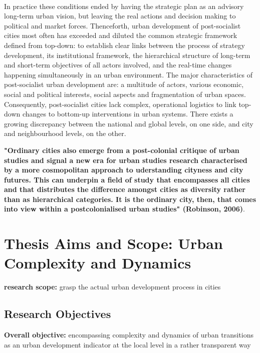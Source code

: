 \documentclass[11pt]{report}
\begin{document}
\\
In practice these conditions ended by having the strategic plan as an advisory long-term urban vision, but leaving the real actions and decision making to political and market forces. Thenceforth, urban development of post-socialist cities most often has exceeded and diluted the common strategic framework defined from top-down: to establish clear links between the process of strategy development, its institutional framework, the hierarchical structure of long-term and short-term objectives of all actors involved, and the real-time changes happening simultaneously in an urban environment. The major characteristics of post-socialist urban development are: a multitude of actors, various economic, social and political interests, social aspects and fragmentation of urban spaces. Consequently, post-socialist cities lack complex, operational logistics \href{check!!!Repetti et al. 2010}{\citealt{check!!!Repetti et al. 2010}} to link top-down changes to bottom-up interventions in urban systems. There exists a growing discrepancy between the national and global levels, on one side, and city and neighbourhood levels, on the other. 

\textbf{"Ordinary cities also emerge from a post-colonial critique of urban studies and signal a new era for urban studies research characterised by a more cosmopolitan approach to uderstanding cityness and city futures. This can underpin a field of study that encompasses all cities and that distributes the difference amongst cities as diversity rather than as hierarchical categories. It is the ordinary city, then, that comes into view within a postcolonialised urban studies" (Robinson, 2006)}.

\section{Thesis Aims and Scope: Urban Complexity and Dynamics}
\textbf{research scope:} grasp the actual urban development process in cities

\subsection{Research Objectives}
\textbf{Overall objective:} encompassing complexity and dynamics of urban transitions as an urban development indicator at the local level in a rather transparent way
\\
\end{document}
